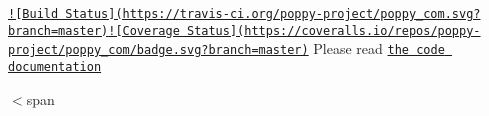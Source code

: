 \href{https://travis-ci.org/poppy-project/poppy_com}{\tt !\mbox{[}Build Status\mbox{]}(https\-://travis-\/ci.\-org/poppy-\/project/poppy\-\_\-com.\-svg?branch=master)}\href{https://coveralls.io/github/poppy-project/poppy_com?branch=master}{\tt !\mbox{[}Coverage Status\mbox{]}(https\-://coveralls.\-io/repos/poppy-\/project/poppy\-\_\-com/badge.\-svg?branch=master)} Please read \href{http://poppy-project.github.io/poppy_com/}{\tt the code documentation}

$<$span 